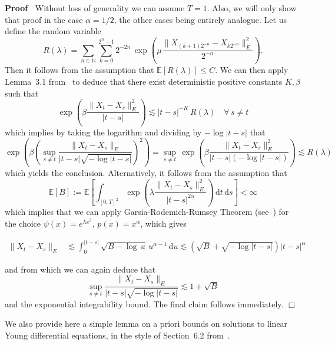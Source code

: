 \documentclass[10pt]{article}
\newcommand{\assign}{:=}
\newcommand{\mathd}{\mathrm{d}}
\newenvironment{proof}{\noindent\textbf{Proof\ }}{\hspace*{\fill}$\Box$\medskip}
\begin{document}
\begin{proof}
  Without loss of generality we can assume $T = 1$. Also, we will only show
  that proof in the case $\alpha = 1 / 2$, the other cases being entirely
  analogue. Let us define the random variable
  \[ R (\lambda) = \sum_{n \in \mathbb{N}} \sum_{k = 0}^{2^n - 1} 2^{- 2 n} \,
     \exp \left( \mu \frac{\| X_{(k + 1) 2^{- n}} - X_{k 2^{- n}} \|^2_E}{2^{-
     n}} \right) . \]
  Then it follows from the assumption that $\mathbb{E} [R (\lambda)] \leqslant
  C$. We can then apply Lemma~3.1 from~{\cite{catelliergubinelli}} to deduce
  that there exist deterministic positive constants $K, \beta$ such that
  \[ \exp \left( \beta \frac{\| X_t - X_s \|^2_E}{| t - s |} \right) \lesssim
     | t - s |^{- K} \, R (\lambda) \quad \forall \, s \neq t \]
  which implies by taking the logarithm and dividing by $- \log | t - s |$
  that
  \[ \exp \left( \beta \left( \sup_{s \neq t} \frac{\| X_t - X_s \|_E}{| t - s
     | \sqrt{- \log | t - s |}} \right)^2 \right) = \sup_{s \neq t} \, \exp
     \left( \beta \frac{\| X_t - X_s \|^2_E}{| t - s | (- \log | t - s |)}
     \right) \lesssim R (\lambda) \]
  which yields the conclusion. Alternatively, it follows from the assumption
  that
  \[ \mathbb{E} [B] \assign \mathbb{E} \left[ \int_{[0, T]^2} \exp \left(
     \lambda \frac{\| X_t - X_s \|^2_E}{| t - s |^{2 \alpha}} \right) \,
     \mathd t \, \mathd s \right] < \infty \]
  which implies that we can apply Garsia-Rodemich-Rumsey Theorem
  (see~{\cite{garsia}}) for the choice $\psi (x) = e^{\lambda x^2}$, $p (x) =
  x^{\alpha}$, which gives
  
  \begin{align}
    \| X_t - X_s \|_E & \lesssim \int_0^{| t - s |} \sqrt{B - \log \, u} \,
    u^{\alpha - 1} \, \mathd u \lesssim \left( \sqrt{B} + \sqrt{- \log | t - s
    |} \right) | t - s |^{\alpha}
  \end{align}
  
  and from which we can again deduce that
  \[ \sup_{s \neq t} \frac{\| X_t - X_s \|_E}{| t - s | \sqrt{- \log | t - s
     |}} \lesssim 1 + \sqrt{B} \]
  and the exponential integrability bound. The final claim follows
  immediately.
\end{proof}

We also provide here a simple lemma on a priori bounds on solutions to linear
Young differential equations, in the style of Section~6.2 from~{\cite{lejay}}.
\end{document}
